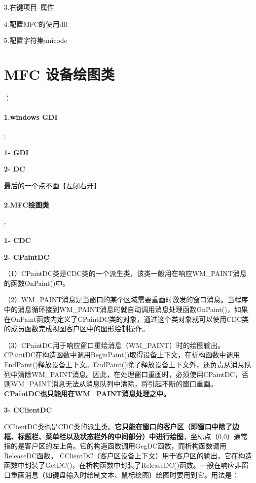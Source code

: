 \documentclass[UTF8,a4paper,8pt]{ctexart}
\begin{document}
	   3.右键项目--属性
	   
	   4.配置MFC的使用dll
	   
	   5.配置字符集unicode
   
   
  \section{MFC 设备绘图类}：
	    \paragraph{1.windows GDI}:
	    
		     \textbf{1- GDI}
		     
		     \textbf{2- DC}
		            
		     最后的一个点不画【左闭右开】
	    \paragraph{2.MFC绘图类}:
	    
		    \textbf{1- CDC}
		     
		    \textbf{2- CPaintDC}
		     
		     （1）CPaintDC类是CDC类的一个派生类，该类一般用在响应WM\_PAINT消息的函数OnPaint()中。
		     
		     （2）WM\_PAINT消息是当窗口的某个区域需要重画时激发的窗口消息。当程序中的消息循环接到WM\_PAINT消息时就自动调用消息处理函数OnPaint()，如果在OnPaint函数内定义了CPaintDC类的对象，通过这个类对象就可以使用CDC类的成员函数完成视图客户区中的图形绘制操作。
		     
		     （3）CPaintDC用于响应窗口重绘消息（WM\_PAINT）时的绘图输出。CPaintDC在构造函数中调用BeginPaint()取得设备上下文，在析构函数中调用EndPaint()释放设备上下文。EndPaint()除了释放设备上下文外，还负责从消息队列中清除WM\_PAINT消息。因此，在处理窗口重画时，必须使用CPaintDC，否则WM\_PAINT消息无法从消息队列中清除，将引起不断的窗口重画。\textbf{CPaintDC也只能用在WM\_PAINT消息处理之中。}
		     
		     \textbf{3- CClientDC}
		  
		       CClientDC类也是CDC类的派生类。\textbf{它只能在窗口的客户区（即窗口中除了边框、标题栏、菜单栏以及状态栏外的中间部分）中进行绘图}，坐标点（0,0）通常指的是客户区的左上角。它的构造函数调用GegDC函数，而析构函数调用ReleaseDC函数。
		       CClientDC（客户区设备上下文）用于客户区的输出，它在构造函数中封装了GetDC()，在析构函数中封装了ReleaseDC()函数。一般在响应非窗口重画消息（如键盘输入时绘制文本、鼠标绘图）绘图时要用到它。用法是：
		  
\end{document}
